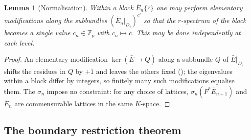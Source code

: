 \documentclass[11pt,reqno]{amsart}
\newcommand{\Zp}{\mathbb{Z}_p}
\theoremstyle{plain}
\newtheorem{lemma}[theorem]{Lemma}
\theoremstyle{definition}
\theoremstyle{remark}
\numberwithin{equation}{section}
\begin{document}
\begin{lemma}[Normalisation]\label{lem:normalise}
Within a block $\bar E_n\{\bar c\}$ one may perform elementary
modifications along the subbundles $(\bar E_n|_{D_i})^{c'}$ so that the
$r$-spectrum of the block becomes a single value $c_n\in\Zp$ with
$c_n\mapsto\bar c$.  This may be done independently at each level.
\end{lemma}
\begin{proof}
An elementary modification $\ker(\bar E\to Q)$ along a subbundle $Q$ of
$\bar E|_{D_i}$ shifts the residues in $Q$ by $+1$ and leaves the others
fixed (); the eigenvalues within a block differ by
integers, so finitely many such modifications equalise them.  The
$\sigma_n$ impose no constraint: for any choice of lattices,
$\sigma_n(F^*\bar E_{n+1})$ and $\bar E_n$ are commensurable lattices in
the same $K$-space.
\end{proof}

\subsection{The boundary restriction theorem}
\end{document}
